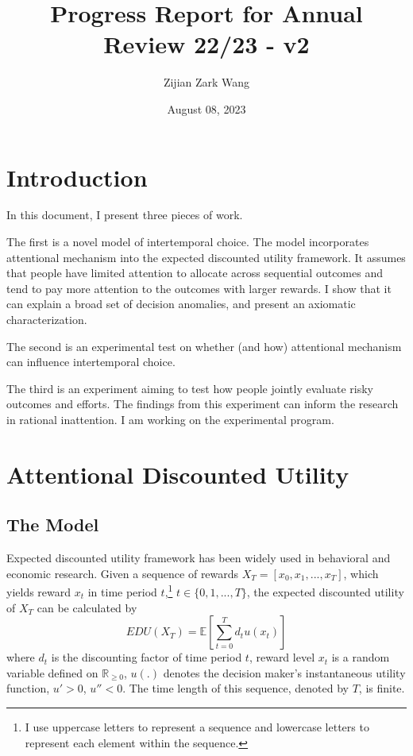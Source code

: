 \documentclass[
  12pt,
]{article}
\title{Progress Report for Annual Review 22/23 - v2}
\author{Zijian Zark Wang}
\date{August 08, 2023}
\begin{document}
\maketitle

\hypertarget{introduction}{%
\section{Introduction}\label{introduction}}

In this document, I present three pieces of work.

The first is a novel model of intertemporal choice. The model
incorporates attentional mechanism into the expected discounted utility
framework. It assumes that people have limited attention to allocate
across sequential outcomes and tend to pay more attention to the
outcomes with larger rewards. I show that it can explain a broad set of
decision anomalies, and present an axiomatic characterization.

The second is an experimental test on whether (and how) attentional
mechanism can influence intertemporal choice.

The third is an experiment aiming to test how people jointly evaluate
risky outcomes and efforts. The findings from this experiment can inform
the research in rational inattention. I am working on the experimental
program.

\hypertarget{attentional-discounted-utility}{%
\section{Attentional Discounted
Utility}\label{attentional-discounted-utility}}

\hypertarget{the-model}{%
\subsection{The Model}\label{the-model}}

Expected discounted utility framework has been widely used in behavioral
and economic research. Given a sequence of rewards
\(X_T=[x_0,x_1,...,x_T]\), which yields reward \(x_t\) in time period
\(t\),\footnote{I use uppercase letters to represent a sequence and
  lowercase letters to represent each element within the sequence.}
\(t \in \{0,1,...,T\}\), the expected discounted utility of \(X_T\) can
be calculated by\[
EDU(X_T)= \mathbb{E}\left[\sum_{t=0}^T d_t u(x_t)\right]
\]where \(d_t\) is the discounting factor of time period \(t\), reward
level \(x_t\) is a random variable defined on \(\mathbb{R}_{\geq 0}\),
\(u(.)\) denotes the decision maker's instantaneous utility function,
\(u'>0\), \(u''<0\). The time length of this sequence, denoted by \(T\),
is finite.
\end{document}
